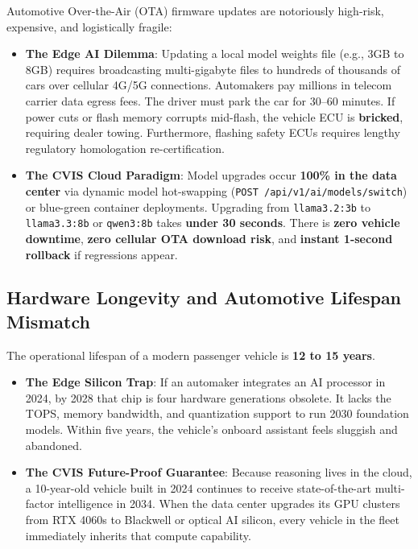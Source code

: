 \documentclass[12pt,a4paper]{report}
\begin{document}
Automotive Over-the-Air (OTA) firmware updates are notoriously high-risk, expensive, and logistically fragile:
\begin{itemize}[leftmargin=1.5cm]
  \item \textbf{The Edge AI Dilemma}: Updating a local model weights file (e.g., 3GB to 8GB) requires broadcasting multi-gigabyte files to hundreds of thousands of cars over cellular 4G/5G connections. Automakers pay millions in telecom carrier data egress fees. The driver must park the car for 30--60 minutes. If power cuts or flash memory corrupts mid-flash, the vehicle ECU is \textbf{bricked}, requiring dealer towing. Furthermore, flashing safety ECUs requires lengthy regulatory homologation re-certification.
  \item \textbf{The CVIS Cloud Paradigm}: Model upgrades occur \textbf{100\% in the data center} via dynamic model hot-swapping (\texttt{POST /api/v1/ai/models/switch}) or blue-green container deployments. Upgrading from \texttt{llama3.2:3b} to \texttt{llama3.3:8b} or \texttt{qwen3:8b} takes \textbf{under 30 seconds}. There is \textbf{zero vehicle downtime}, \textbf{zero cellular OTA download risk}, and \textbf{instant 1-second rollback} if regressions appear.
\end{itemize}

\subsection{Hardware Longevity and Automotive Lifespan Mismatch}

The operational lifespan of a modern passenger vehicle is \textbf{12 to 15 years}.
\begin{itemize}[leftmargin=1.5cm]
  \item \textbf{The Edge Silicon Trap}: If an automaker integrates an AI processor in 2024, by 2028 that chip is four hardware generations obsolete. It lacks the TOPS, memory bandwidth, and quantization support to run 2030 foundation models. Within five years, the vehicle's onboard assistant feels sluggish and abandoned.
  \item \textbf{The CVIS Future-Proof Guarantee}: Because reasoning lives in the cloud, a 10-year-old vehicle built in 2024 continues to receive state-of-the-art multi-factor intelligence in 2034. When the data center upgrades its GPU clusters from RTX 4060s to Blackwell or optical AI silicon, every vehicle in the fleet immediately inherits that compute capability.
\end{itemize}
\end{document}
